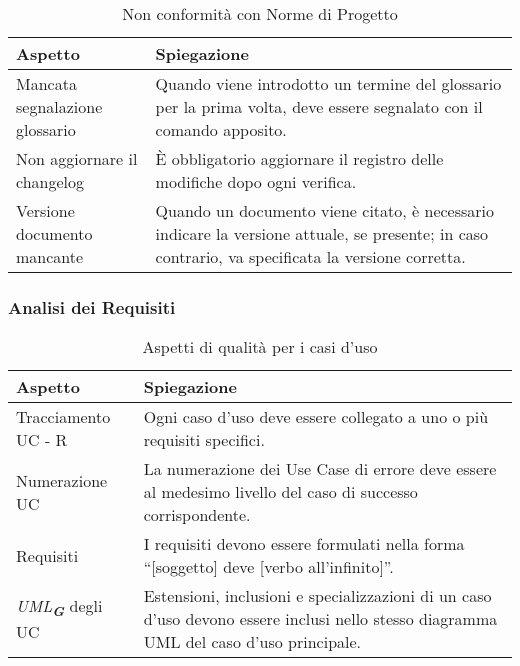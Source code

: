 \begin{table}[h!]
    \centering
    \renewcommand{\arraystretch}{1.5} %
    \begin{tabularx}{\textwidth}{|p{}|X|}
    \hline
    \rowcolor[HTML]{FFD700}
    \textbf{Aspetto} & \textbf{Spiegazione} \\ \hline
    Mancata segnalazione glossario & Quando viene introdotto un termine del glossario per la prima volta, deve essere segnalato con il comando apposito. \\ \hline
    Non aggiornare il changelog & È obbligatorio aggiornare il registro delle modifiche dopo ogni verifica. \\ \hline
    Versione documento mancante & Quando un documento viene citato, è necessario indicare la versione attuale, se presente; in caso contrario, va specificata la versione corretta. \\ \hline
    \end{tabularx}
    \caption{Non conformità con Norme di Progetto}
\end{table}


\subsubsection{Analisi dei Requisiti}
\begin{table}[h!]
    \centering
    \renewcommand{\arraystretch}{1.5} %
    \begin{tabularx}{\textwidth}{|p{}|X|}
    \hline
    \rowcolor[HTML]{FFD700}
    \textbf{Aspetto} & \textbf{Spiegazione} \\ \hline
    Tracciamento UC - R & Ogni caso d'uso deve essere collegato a uno o più requisiti specifici. \\ \hline
    Numerazione UC & La numerazione dei Use Case di errore deve essere al medesimo livello del caso di successo corrispondente. \\ \hline
    Requisiti & I requisiti devono essere formulati nella forma “[soggetto] deve [verbo all'infinito]”. \\ \hline
    \emph{UML}\textsubscript{\textit{\textbf{G}}} degli UC & Estensioni, inclusioni e specializzazioni di un caso d'uso devono essere inclusi nello stesso diagramma UML del caso d'uso principale. \\ \hline
    \end{tabularx}
    \caption{Aspetti di qualità per i casi d'uso}
\end{table}
